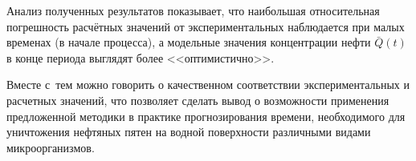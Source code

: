 %

%















%



%





Анализ полученных результатов показывает, что наибольшая относительная погрешность расчётных значений от экспериментальных наблюдается при малых временах (в начале процесса), а модельные значения концентрации нефти $\bar Q(t)$ в конце периода выглядят более <<оптимистично>>. 

Вместе с~тем можно говорить о качественном соответствии экспериментальных и расчетных значений, что позволяет сделать вывод о возможности применения предложенной методики в практике прогнозирования времени, необходимого для уничтожения нефтяных пятен на водной поверхности различными видами микроорганизмов.





